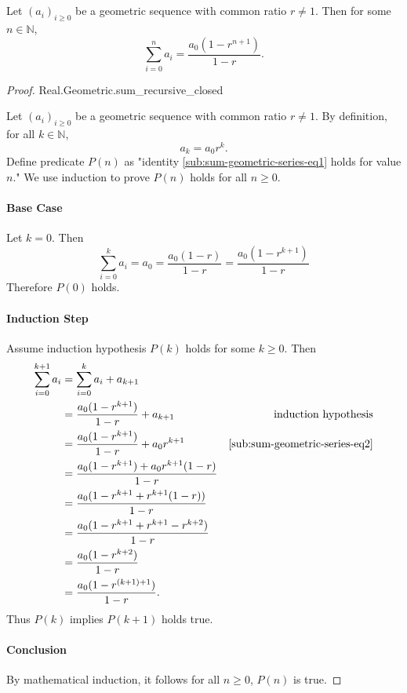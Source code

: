 \documentclass{article}
\begin{document}
\subsection{}%
\label{sub:sum-geometric-series}

Let $(a_i)_{i \geq 0}$ be a geometric sequence with common ratio $r \neq 1$.
  Then for some $n \in \mathbb{N}$,
  \begin{equation}
    \label{sub:sum-geometric-series-eq1}
    \sum_{i=0}^n a_i = \frac{a_0(1 - r^{n+1})}{1 - r}.
  \end{equation}

\begin{proof}

    {Real.Geometric.sum\_recursive\_closed}

  Let $(a_i)_{i \geq 0}$ be a geometric sequence with common ratio $r \neq 1$.
  By definition, for all $k \in \mathbb{N}$,
    \begin{equation}
      \label{sub:sum-geometric-series-eq2}
      a_k = a_0r^k.
    \end{equation}
  Define predicate $P(n)$ as "identity \eqref{sub:sum-geometric-series-eq1}
    holds for value $n$."
  We use induction to prove $P(n)$ holds for all $n \geq 0$.

  \paragraph{Base Case}%

    Let $k = 0$.
    Then $$\sum_{i=0}^k a_i = a_0 = \frac{a_0(1 - r)}{1 - r} =
      \frac{a_0(1 - r^{k+1})}{1 - r}$$
    Therefore $P(0)$ holds.

  \paragraph{Induction Step}%

    Assume induction hypothesis $P(k)$ holds for some $k \geq 0$.
    Then
      \begin{align*}
        \sum_{i=0}^{k+1} a_i
          & = \sum_{i=0}^k a_i + a_{k+1} \\
          & = \frac{a_0(1 - r^{k+1})}{1 - r} + a_{k + 1}
            & \text{induction hypothesis} \\
          & = \frac{a_0(1 - r^{k+1})}{1 - r} + a_0r^{k + 1}
            & \eqref{sub:sum-geometric-series-eq2} \\
          & = \frac{a_0(1 - r^{k+1}) + a_0r^{k+1}(1 - r)}{1 - r} \\
          & = \frac{a_0(1 - r^{k+1} + r^{k+1}(1 - r))}{1 - r} \\
          & = \frac{a_0(1 - r^{k+1} + r^{k+1} - r^{k+2})}{1 - r} \\
          & = \frac{a_0(1 - r^{k+2})}{1 - r} \\
          & = \frac{a_0(1 - r^{(k + 1) + 1})}{1 - r}.
      \end{align*}
    Thus $P(k)$ implies $P(k + 1)$ holds true.

  \paragraph{Conclusion}%

    By mathematical induction, it follows for all $n \geq 0$, $P(n)$ is true.

\end{proof}
\end{document}
